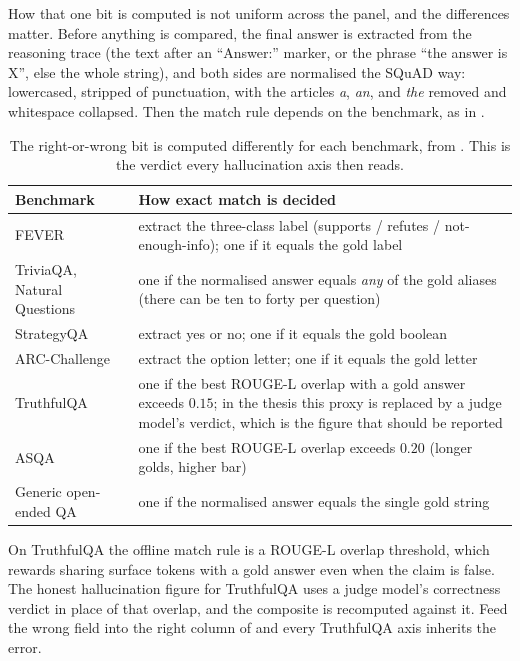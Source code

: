How that one bit is computed is not uniform across the panel, and the differences
matter. Before anything is compared, the final answer is extracted from the reasoning
trace (the text after an ``Answer:'' marker, or the phrase ``the answer is X'', else the
whole string), and both sides are normalised the SQuAD way: lowercased, stripped of
punctuation, with the articles \emph{a}, \emph{an}, and \emph{the} removed and whitespace
collapsed. Then the match rule depends on the benchmark, as in .

\begin{table}[H]
\centering
\small
\begin{tabular}{@{}p{3.6cm}p{11.1cm}@{}}
\toprule
\textbf{Benchmark} & \textbf{How exact match is decided} \\
\midrule
FEVER & extract the three-class label (supports / refutes / not-enough-info); one if it equals the gold label \\
TriviaQA, Natural Questions & one if the normalised answer equals \emph{any} of the gold aliases (there can be ten to forty per question) \\
StrategyQA & extract yes or no; one if it equals the gold boolean \\
ARC-Challenge & extract the option letter; one if it equals the gold letter \\
TruthfulQA & one if the best ROUGE-L overlap with a gold answer exceeds $0.15$; in the thesis this proxy is replaced by a judge model's verdict, which is the figure that should be reported \\
ASQA & one if the best ROUGE-L overlap exceeds $0.20$ (longer golds, higher bar) \\
Generic open-ended QA & one if the normalised answer equals the single gold string \\
\bottomrule
\end{tabular}
\caption[How exact match is decided per benchmark]{The right-or-wrong bit is computed
differently for each benchmark, from . This is the verdict every
hallucination axis then reads.}
\label{tab:em-rules}
\end{table}

\begin{pitfall}
On TruthfulQA the offline match rule is a ROUGE-L overlap threshold, which rewards
sharing surface tokens with a gold answer even when the claim is false. The honest
hallucination figure for TruthfulQA uses a judge model's correctness verdict in place of
that overlap, and the composite is recomputed against it. Feed the wrong field into the
right column of  and every TruthfulQA axis inherits the error.
\end{pitfall}

